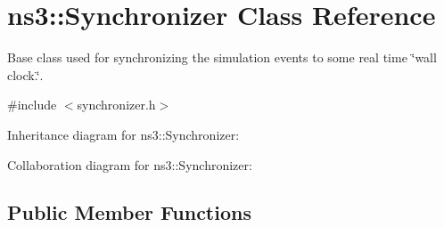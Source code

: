 \hypertarget{classns3_1_1Synchronizer}{}\section{ns3\+:\+:Synchronizer Class Reference}
\label{classns3_1_1Synchronizer}


Base class used for synchronizing the simulation events to some real time \char`\"{}wall clock.\char`\"{}.  




{\ttfamily \#include $<$synchronizer.\+h$>$}



Inheritance diagram for ns3\+:\+:Synchronizer\+:


Collaboration diagram for ns3\+:\+:Synchronizer\+:
\subsection*{Public Member Functions}
